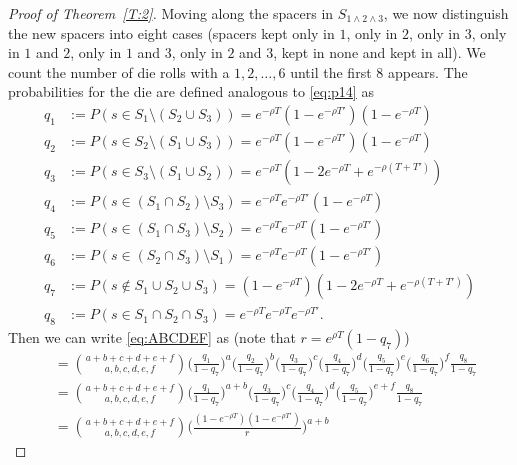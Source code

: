 \documentclass[preprint,authoryear]{elsarticle}
\theoremstyle{definition}
\numberwithin{equation}{section}
\numberwithin{figure}{section}
\newcommand{\ehalb}[1][]{e^{-#1\rho T}}
\newcommand{\etwohalb}[1][]{e^{-#1\rho T'}}
\newcommand{\eonetwohalb}[1][]{e^{-#1\rho (T+T')}}
\begin{document}
\begin{proof}[Proof of Theorem~\ref{T:2}]
  Moving along the spacers in
  $S_{\mathfrak 1\wedge \mathfrak 2\wedge \mathfrak 3}$, we now
  distinguish the new spacers into eight cases (spacers kept only in $\mathfrak 1$,
  only in $\mathfrak 2$, only in $\mathfrak 3$, only in $\mathfrak 1$
  and $\mathfrak 2$, only in $\mathfrak 1$ and $\mathfrak 3$, only in
  $\mathfrak 2$ and $\mathfrak 3$, kept in none and kept in all). We
  count the number of die rolls with a $1,2,\dots,6$ until the first
  $8$ appears. The probabilities for the die are defined analogous to
  \eqref{eq:p14} as
  \begin{align*}
    q_1 &:= P(s\in S_\mathfrak1 \setminus (S_\mathfrak2 \cup S_\mathfrak3)) =  \ehalb(1-\etwohalb)(1-\ehalb)\\
    q_2 &:= P(s\in S_\mathfrak2 \setminus (S_\mathfrak1 \cup S_\mathfrak3)) = \ehalb(1-\etwohalb)(1-\ehalb)\\
    q_3 &:= P(s\in S_\mathfrak3 \setminus (S_\mathfrak1 \cup S_\mathfrak2)) = \ehalb(1-2\ehalb+\eonetwohalb)\\
    q_4 &:= P(s\in (S_\mathfrak1 \cap S_\mathfrak2) \setminus S_\mathfrak3) = \ehalb\etwohalb(1-\ehalb)\\
    q_5 &:= P(s\in (S_\mathfrak1 \cap S_\mathfrak3) \setminus S_\mathfrak2) = \ehalb\ehalb(1-\etwohalb)\\
    q_6 &:= P(s\in (S_\mathfrak2 \cap S_\mathfrak3) \setminus S_\mathfrak1) = \ehalb\ehalb(1-\etwohalb)\\
    q_7 &:= P(s\notin S_\mathfrak1 \cup S_\mathfrak2 \cup S_\mathfrak3) = (1-\ehalb)(1-2\ehalb+\eonetwohalb)\\
    q_8 &:= P(s\in S_\mathfrak1 \cap S_\mathfrak2 \cap S_\mathfrak3) = \ehalb\ehalb\etwohalb.
  \end{align*}
  Then we can write \eqref{eq:ABCDEF} as (note that
  $ r = e^{\rho T}(1-q_7)$)
  \begin{align*}
    &=\binom{a+b+c+d+e+f}{a,b,c,d,e,f}
      \Big(\frac{q_1}{1-q_7}\Big)^a
      \Big(\frac{q_2}{1-q_7}\Big)^b
      \Big(\frac{q_3}{1-q_7}\Big)^c
      \Big(\frac{q_4}{1-q_7}\Big)^d
      \Big(\frac{q_5}{1-q_7}\Big)^e
      \Big(\frac{q_6}{1-q_7}\Big)^f
      \frac{q_8}{1-q_7}
    \\&=\binom{a+b+c+d+e+f}{a,b,c,d,e,f}
        \Big(\frac{q_1}{1-q_7}\Big)^{a+b}
        \Big(\frac{q_3}{1-q_7}\Big)^c
        \Big(\frac{q_4}{1-q_7}\Big)^d
        \Big(\frac{q_5}{1-q_7}\Big)^{e+f}
        \frac{q_8}{1-q_7}
    \\&=\binom{a+b+c+d+e+f}{a,b,c,d,e,f}
        \Big(\frac{(1-e^{-\rho T})(1-e^{-\rho T'})}{r}\Big)^{a+b}

\end{align*}
\end{proof}
\end{document}
